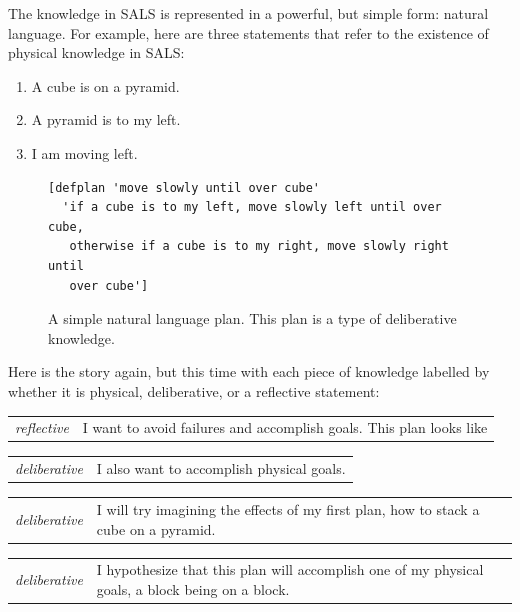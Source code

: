 The knowledge in SALS is represented in a powerful, but simple form:
natural language.  For example, here are three statements that refer to
the existence of physical knowledge in SALS:
\begin{samepage}
  \begin{enumerate}
  \item{A cube is on a pyramid.}
  \item{A pyramid is to my left.}
  \item{I am moving left.}
  \end{enumerate}
\end{samepage}

\begin{figure}[h]
\centering
{\small
\begin{Verbatim}[frame=single]
[defplan 'move slowly until over cube'
  'if a cube is to my left, move slowly left until over cube,
   otherwise if a cube is to my right, move slowly right until
   over cube']
\end{Verbatim}
}
\caption[A simple natural language plan.]{A simple natural language
  plan.  This plan is a type of deliberative knowledge.}
\label{figure:semantic_event_knowledge_base}
\end{figure}




Here is the story again, but this time with each piece of knowledge
labelled by whether it is physical, deliberative, or a reflective
statement:

\begin{tabular}{p{2cm}p{8cm}}
  {\emph{reflective}} & I want to avoid failures and accomplish goals.
  This plan looks like \\
\end{tabular}

\begin{tabular}{p{2cm}p{8cm}}
  {\emph{deliberative}} & I also want to accomplish physical goals. \\
\end{tabular}

\begin{tabular}{p{2cm}p{8cm}}
  {\emph{deliberative}} & I will try imagining the effects of my first
  plan, how to stack a cube on a pyramid. \\
\end{tabular}

\begin{tabular}{p{2cm}p{8cm}}
  {\emph{deliberative}} & I hypothesize that this plan will accomplish
  one of my physical goals, a block being on a block. \\
\end{tabular}


